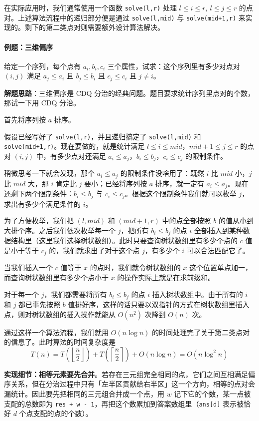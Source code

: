 在实际应用时，我们通常使用一个函数 \texttt{solve(l,r)} 处理 $l \le i \le r,\ l \le j \le r$ 的点对。上述算法流程中的递归部分便是通过 \texttt{solve(l,mid)} 与 \texttt{solve(mid+1,r)} 来实现的。剩下的第二类点对则需要额外设计算法解决。

\paragraph{例题：三维偏序}
给定一个序列，每个点有 $a_i,b_i,c_i$ 三个属性，试求：这个序列里有多少对点对 $(i,j)$ 满足 $a_j \le a_i$ 且 $b_j \le b_i$ 且 $c_j \le c_i$ 且 $j \ne i$。

\textbf{解题思路}：三维偏序是 CDQ 分治的经典问题。题目要求统计序列里点对的个数，那试一下用 CDQ 分治。

首先将序列按 $a$ 排序。

假设已经写好了 \texttt{solve(l,r)}，并且递归搞定了 \texttt{solve(l,mid)} 和 \texttt{solve(mid+1,r)}。现在要做的，就是统计满足 $l \le i \le mid$，$mid+1 \le j \le r$ 的点对 $(i,j)$ 中，有多少点对还满足 $a_i \le a_j$，$b_i \le b_j$，$c_i \le c_j$ 的限制条件。

稍微思考一下就会发现，那个 $a_i \le a_j$ 的限制条件没啥用了：既然 $i$ 比 $mid$ 小，$j$ 比 $mid$ 大，那 $i$ 肯定比 $j$ 要小；已经将序列按 $a$ 排序，就一定有 $a_i \le a_j$。现在还剩下两个限制条件：$b_i \le b_j$ 与 $c_i \le c_j$。根据这个限制条件我们就可以枚举 $j$，求出有多少个满足条件的 $i$。

为了方便枚举，我们把 $(l,mid)$ 和 $(mid+1,r)$ 中的点全部按照 $b$ 的值从小到大排个序。之后我们依次枚举每一个 $j$，把所有 $b_i \le b_j$ 的点 $i$ 全部插入到某种数据结构里（这里我们选择树状数组）。此时只要查询树状数组里有多少个点的 $c$ 值是小于等于 $c_j$ 的，我们就求出了对于这个点 $j$，有多少个 $i$ 可以合法匹配它了。

当我们插入一个 $c$ 值等于 $x$ 的点时，我们就令树状数组的 $x$ 这个位置单点加一，而查询树状数组里有多少个点小于 $x$ 的操作实际上就是在求前缀和。

对于每一个 $j$，我们都需要将所有 $b_i \le b_j$ 的点 $i$ 插入树状数组中。由于所有的 $i$ 和 $j$ 都已事先按照 $b$ 值排好序，这样的话只要以双指针的方式在树状数组里插入点，则对树状数组的插入操作就能从 $O(n^2)$ 次降到 $O(n)$ 次。

通过这样一个算法流程，我们就用 $O(n\log n)$ 的时间处理完了关于第二类点对的信息了。此时算法的时间复杂度是
$$T(n)=T\!\left(\left\lfloor \frac n2 \right\rfloor\right)+T\!\left(\left\lceil \frac n2 \right\rceil\right)+O(n\log n)=O(n\log^2 n)$$

\textbf{实现细节：相等元素要先合并}。若存在三元组完全相同的点，它们之间互相满足偏序关系，但在分治过程中只有「左半区贡献给右半区」这一个方向，相等的点对会漏统计。因此要先把相同的三元组合并成一个点，用 $w$ 记下它的个数，某一点被支配的总数即为 \texttt{res + w - 1}，再把这个数累加到答案数组里（\texttt{ans[d]} 表示被恰好 $d$ 个点支配的点的个数）。

